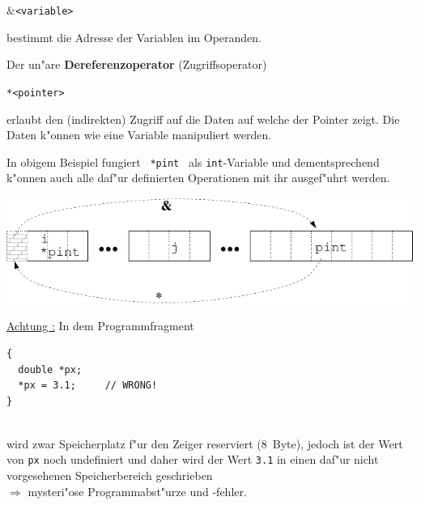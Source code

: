 \centerline{\texttt{$\&$<variable>}}

bestimmt die Adresse der Variablen im Operanden.

Der un"are \textbf{Dereferenzoperator} (Zugriffsoperator)

\centerline{\texttt{*<pointer>}}

erlaubt den (indirekten) Zugriff auf die Daten auf
welche der Pointer zeigt. Die Daten k"onnen wie
eine Variable manipuliert werden.
%
%





In obigem Beispiel fungiert \verb| *pint | als \verb|int|-Variable und
dementsprechend k"onnen auch alle daf"ur definierten Operationen mit ihr
ausgef"uhrt werden.
\\[0.5ex]
% 
\centerline{\includegraphics[scale=0.9]{kap621.pdf}}

\underline{Achtung :} In dem Programmfragment
\\[0.5ex]
\begin{minipage} {0.5\textwidth}
\begin{verbatim}
{
  double *px;
  *px = 3.1;     // WRONG!
}
\end{verbatim}
\end{minipage}
\\[0.5ex]
wird  zwar Speicherplatz  f"ur den Zeiger  reserviert  (8~Byte),
jedoch ist der  Wert von \verb|px| noch undefiniert und daher
wird der Wert \verb|3.1| in einen daf"ur nicht vorgesehenen
Speicherbereich geschrieben \\
$\Longrightarrow$ mysteri"ose Programmabst"urze und -fehler.

